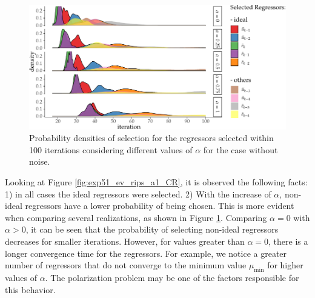 \begin{exmp}
  \begin{figure}[htpb]
    \centering
    \includegraphics{Figs/Cap5/ex51_iter_con_COM_ruido.tex.pdf}
    \caption{Probability densities of selection for the regressors selected within 100 iterations considering different values of $\alpha$ for the case without noise.}
    \label{fig:exp51_dens_prob_CR}
  \end{figure}

  Looking at Figure \ref{fig:exp51_ev_rips_a1_CR}, it is observed the following facts: 1) in all cases the ideal regressors were selected. 2) With the increase of $\alpha$, non-ideal regressors have a lower probability of being chosen. This is more evident when comparing several realizations, as shown in Figure \ref{fig:exp51_dens_prob_CR}. Comparing $\alpha=0$ with $\alpha>0$, it can be seen that the probability of selecting non-ideal regressors decreases for smaller iterations. However, for values greater than $\alpha=0$, there is a longer convergence time for the regressors. For example, we notice a greater number of regressors that do not converge to the minimum value $\mu_{\min}$ for higher values of $\alpha$. The polarization problem may be one of the factors responsible for this behavior.


\end{exmp}

